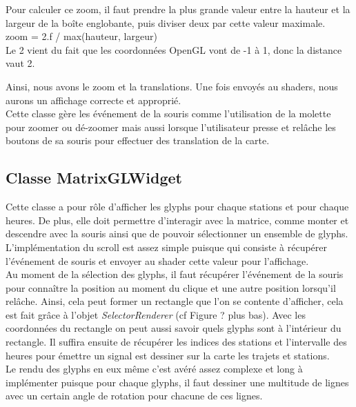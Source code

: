 \documentclass[12pt]{article}
\begin{document}
	Pour calculer ce zoom, il faut prendre la plus grande valeur entre la hauteur et la largeur de la boîte englobante, puis diviser deux par cette valeur maximale.\\

	zoom = 2.f / max(hauteur, largeur)\\

	Le 2 vient du fait que les coordonnées OpenGL vont de -1 à 1, donc la distance vaut 2.

	Ainsi, nous avons le zoom et la translations. Une fois envoyés au shaders, nous aurons un affichage correcte et approprié.\\

	Cette classe gère les événement de la souris comme l’utilisation de la molette pour zoomer ou dé-zoomer mais aussi lorsque l’utilisateur presse et relâche les boutons de sa souris pour effectuer des translation de la carte.
		
		\subsection{Classe MatrixGLWidget}		
		Cette classe a pour rôle d’afficher les glyphs pour chaque stations et pour chaque heures. De plus, elle doit permettre d’interagir avec la matrice, comme monter et descendre avec la souris ainsi que de pouvoir sélectionner un ensemble de glyphs.\\

		L'implémentation du scroll est assez simple puisque qui consiste à récupérer l'événement de souris et envoyer au shader cette valeur pour l’affichage.\\

		Au moment de la sélection des glyphs, il faut récupérer l'événement de la souris pour connaître la position au moment du clique et une autre position lorsqu’il relâche. Ainsi, cela peut former un rectangle que l’on se contente d’afficher, cela est fait grâce à l’objet \textit{SelectorRenderer} (cf Figure ? plus bas). Avec les coordonnées du rectangle on peut aussi savoir quels glyphs sont à l'intérieur du rectangle. Il suffira ensuite de récupérer les indices des stations et l’intervalle des heures pour émettre un signal est dessiner sur la carte les trajets et stations.\\

		Le rendu des glyphs en eux même c’est avéré assez complexe et long à implémenter puisque pour chaque glyphs, il faut dessiner une multitude de lignes avec un certain angle de rotation pour chacune de ces lignes.
		
\end{document}
